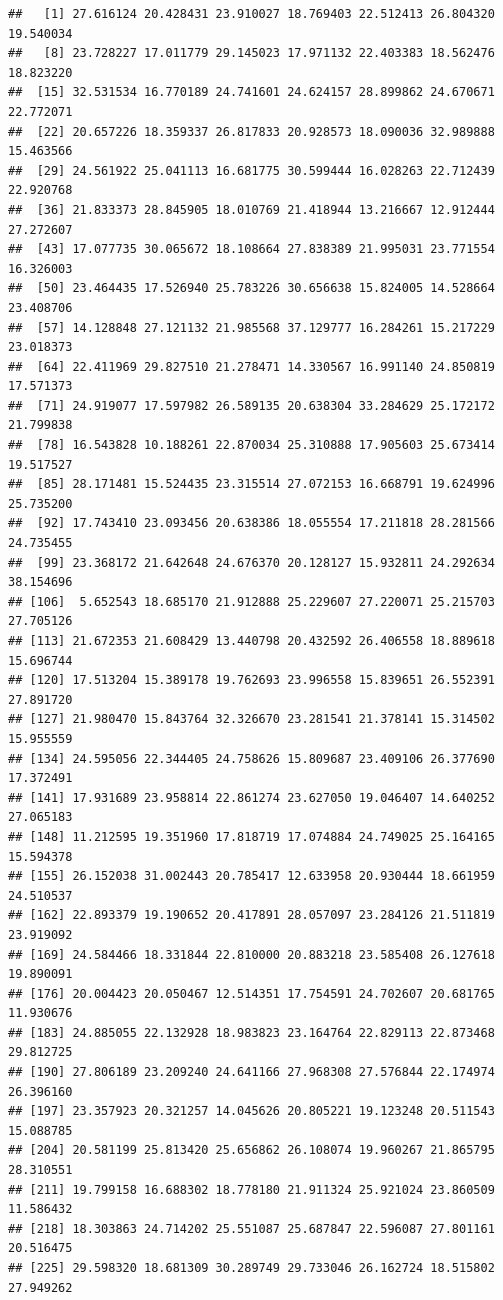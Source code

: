 \documentclass[runningheads]{llncs}
\begin{document}
\begin{verbatim}
##   [1] 27.616124 20.428431 23.910027 18.769403 22.512413 26.804320 19.540034
##   [8] 23.728227 17.011779 29.145023 17.971132 22.403383 18.562476 18.823220
##  [15] 32.531534 16.770189 24.741601 24.624157 28.899862 24.670671 22.772071
##  [22] 20.657226 18.359337 26.817833 20.928573 18.090036 32.989888 15.463566
##  [29] 24.561922 25.041113 16.681775 30.599444 16.028263 22.712439 22.920768
##  [36] 21.833373 28.845905 18.010769 21.418944 13.216667 12.912444 27.272607
##  [43] 17.077735 30.065672 18.108664 27.838389 21.995031 23.771554 16.326003
##  [50] 23.464435 17.526940 25.783226 30.656638 15.824005 14.528664 23.408706
##  [57] 14.128848 27.121132 21.985568 37.129777 16.284261 15.217229 23.018373
##  [64] 22.411969 29.827510 21.278471 14.330567 16.991140 24.850819 17.571373
##  [71] 24.919077 17.597982 26.589135 20.638304 33.284629 25.172172 21.799838
##  [78] 16.543828 10.188261 22.870034 25.310888 17.905603 25.673414 19.517527
##  [85] 28.171481 15.524435 23.315514 27.072153 16.668791 19.624996 25.735200
##  [92] 17.743410 23.093456 20.638386 18.055554 17.211818 28.281566 24.735455
##  [99] 23.368172 21.642648 24.676370 20.128127 15.932811 24.292634 38.154696
## [106]  5.652543 18.685170 21.912888 25.229607 27.220071 25.215703 27.705126
## [113] 21.672353 21.608429 13.440798 20.432592 26.406558 18.889618 15.696744
## [120] 17.513204 15.389178 19.762693 23.996558 15.839651 26.552391 27.891720
## [127] 21.980470 15.843764 32.326670 23.281541 21.378141 15.314502 15.955559
## [134] 24.595056 22.344405 24.758626 15.809687 23.409106 26.377690 17.372491
## [141] 17.931689 23.958814 22.861274 23.627050 19.046407 14.640252 27.065183
## [148] 11.212595 19.351960 17.818719 17.074884 24.749025 25.164165 15.594378
## [155] 26.152038 31.002443 20.785417 12.633958 20.930444 18.661959 24.510537
## [162] 22.893379 19.190652 20.417891 28.057097 23.284126 21.511819 23.919092
## [169] 24.584466 18.331844 22.810000 20.883218 23.585408 26.127618 19.890091
## [176] 20.004423 20.050467 12.514351 17.754591 24.702607 20.681765 11.930676
## [183] 24.885055 22.132928 18.983823 23.164764 22.829113 22.873468 29.812725
## [190] 27.806189 23.209240 24.641166 27.968308 27.576844 22.174974 26.396160
## [197] 23.357923 20.321257 14.045626 20.805221 19.123248 20.511543 15.088785
## [204] 20.581199 25.813420 25.656862 26.108074 19.960267 21.865795 28.310551
## [211] 19.799158 16.688302 18.778180 21.911324 25.921024 23.860509 11.586432
## [218] 18.303863 24.714202 25.551087 25.687847 22.596087 27.801161 20.516475
## [225] 29.598320 18.681309 30.289749 29.733046 26.162724 18.515802 27.949262

\end{verbatim}
\end{document}
